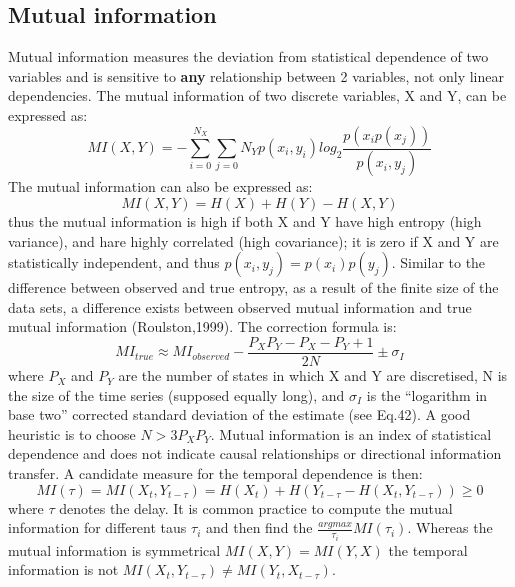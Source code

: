 \subsection{Mutual information}
Mutual information measures the deviation from statistical dependence of two
variables and is sensitive to \textbf{any} relationship between 2 variables,
not only linear dependencies.
The mutual information of two discrete variables, X and Y, can be expressed as:
\begin{equation}
MI(X,Y)=-\sum_{i=0}^{N_{X}} \sum_{j=0}{N_{Y}} p(x_{i},y_{i}) log_2 \frac {p(x_{i}p(x_{j}))}{p(x_{i},y_{j})}
\end{equation}
The mutual information can also be expressed as:
\begin{equation}
MI(X,Y)=H(X)+H(Y)-H(X,Y)
\end{equation}
thus the mutual information is high if both X and Y have high entropy (high variance),
and hare highly correlated (high covariance); it is zero if X and Y are statistically independent,
and thus $p(x_i,y_j)=p(x_i)p(y_j)$.
Similar to the difference between observed and true entropy, as a result of the
finite size of the data sets, a difference exists between observed mutual information
and true mutual information (Roulston,1999).
The correction formula is:
\begin{equation}
MI_{true}\approx MI_{observed} - \frac{P_{X}P_{Y}-P_{X}-P_{Y}+1}{2 N} \pm \sigma_{I}
\end{equation}
where $P_{X}$ and $P_{Y}$ are the number of states in which X and Y are discretised,
N is the size of the time series (supposed equally long), and $\sigma_{I}$ is the
``logarithm in base two'' corrected standard deviation of the estimate
(see \citep{Roulston1999:Estimation} Eq.42).
A good heuristic is to choose $N>3 P_{X} P_{Y}$.
Mutual information is an index of statistical dependence and does not indicate causal
relationships or directional information transfer.
A candidate measure for the temporal dependence is then:
\begin{equation}
MI(\tau)=MI(X_{t},Y_{t-\tau})=H(X_{t})+H(Y_{t-\tau}-H(X_{t},Y_{t-\tau})) \geqslant 0
\end{equation}
where $\tau$ denotes the delay. It is common practice to compute the mutual
information for different taus $\tau_{i}$ and then find the $\frac{argmax}{\tau_i} MI(\tau_i)$.
Whereas the mutual information is symmetrical $MI(X,Y)=MI(Y,X)$ the temporal
information is not $MI(X_{t},Y_{t-\tau}) \neq MI(Y_{t},X_{t-\tau})$.

